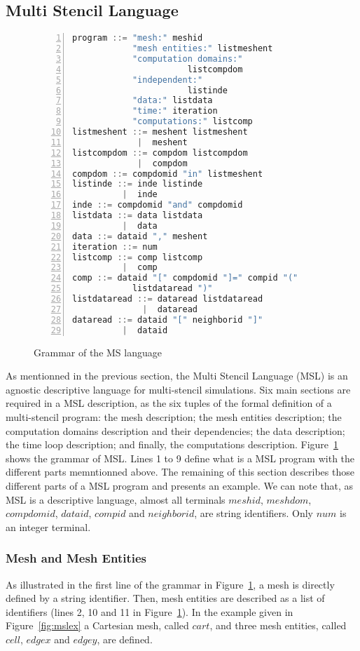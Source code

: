 \subsection{Multi Stencil Language}

\begin{figure}[t]
\begin{lstlisting}[basicstyle=\small,mathescape,frame=single,language=C++,numbers=left]
program ::= "mesh:" meshid 
            "mesh entities:" listmeshent
            "computation domains:" 
                       listcompdom
            "independent:"
                       listinde
            "data:" listdata
            "time:" iteration
            "computations:" listcomp
listmeshent ::= meshent listmeshent
             |  meshent
listcompdom ::= compdom listcompdom
             |  compdom
compdom ::= compdomid "in" listmeshent
listinde ::= inde listinde
          |  inde
inde ::= compdomid "and" compdomid
listdata ::= data listdata
          |  data
data ::= dataid "," meshent
iteration ::= num
listcomp ::= comp listcomp
          |  comp
comp ::= dataid "[" compdomid "]=" compid "(" 
            listdataread ")"
listdataread ::= dataread listdataread
              |  dataread
dataread ::= dataid "[" neighborid "]"
          |  dataid
\end{lstlisting}
\caption{Grammar of the MS language}
\label{fig:grammar}
\end{figure}

As mentionned in the previous section, the Multi Stencil Language (MSL) is an agnostic descriptive language for multi-stencil simulations. Six main sections are required in a MSL description, as the six tuples of the formal definition of a multi-stencil program: the mesh description; the mesh entities description; the computation domains description and their dependencies; the data description; the time loop description; and finally, the computations description. Figure~\ref{fig:grammar} shows the grammar of MSL. Lines 1 to 9 define what is a MSL program with the different parts memntionned above. The remaining of this section describes those different parts of a MSL program and presents an example.
We can note that, as MSL is a descriptive language, almost all terminals $meshid$, $meshdom$, $compdomid$, $dataid$, $compid$ and $neighborid$, are string identifiers. Only $num$ is an integer terminal.

\subsubsection*{Mesh and Mesh Entities}
As illustrated in the first line of the grammar in Figure~\ref{fig:grammar}, a mesh is directly defined by a string identifier. Then, mesh entities are described as a list of identifiers (lines 2, 10 and 11 in Figure~\ref{fig:grammar}). In the example given in Figure~\ref{fig:mslex} a Cartesian mesh, called $cart$, and three mesh entities, called $cell$, $edgex$ and $edgey$, are defined.

